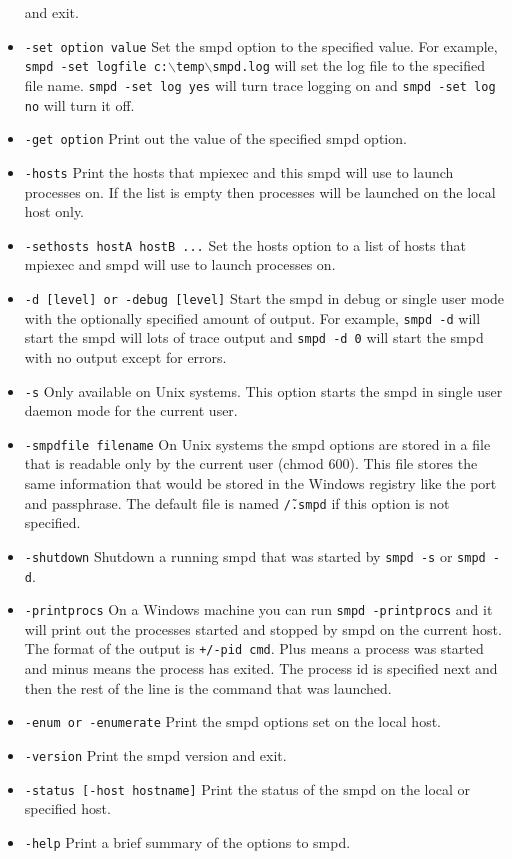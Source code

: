 \documentclass[dvipdfm,11pt]{article}
\begin{document}
\begin{itemize}
and exit.
\item \texttt{-set option value}
Set the smpd option to the specified value.  For example, \texttt{smpd -set logfile c:$\backslash$temp$\backslash$smpd.log} will set the log file to the 
specified file name.  \texttt{smpd -set log yes} will turn trace logging on and
\texttt{smpd -set log no} will turn it off.
\item \texttt{-get option}
Print out the value of the specified smpd option.
\item \texttt{-hosts}
Print the hosts that mpiexec and this smpd will use to launch processes on.  
If the list is empty then processes will be launched on the local host only.
\item \texttt{-sethosts hostA hostB ...}
Set the hosts option to a list of hosts that mpiexec and smpd will use to launch
processes on.
\item \texttt{-d [level] or -debug [level]}
Start the smpd in debug or single user mode with the optionally specified amount
of output.  For example, \texttt{smpd -d} will start the smpd will lots of trace
output and \texttt{smpd -d 0} will start the smpd with no output except for errors.
\item \texttt{-s}
Only available on Unix systems.  This option starts the smpd in single user daemon
mode for the current user.
\item \texttt{-smpdfile filename}
On Unix systems the smpd options are stored in a file that is readable only by
the current user (chmod 600).  This file stores the same information that would
be stored in the Windows registry like the port and passphrase.  The default
file is named \texttt{\~/.smpd} if this option is not specified.
\item \texttt{-shutdown}
Shutdown a running smpd that was started by \texttt{smpd -s} or \texttt{smpd -d}.
\item \texttt{-printprocs}
On a Windows machine you can run \texttt{smpd -printprocs} and it will print out
the processes started and stopped by smpd on the current host.  The format of the
output is \texttt{+/-pid cmd}.  Plus means a process was started and minus means
the process has exited.  The process id is specified next and then the rest of the line
is the command that was launched.
\item \texttt{-enum or -enumerate}
Print the smpd options set on the local host.
\item \texttt{-version}
Print the smpd version and exit.
\item \texttt{-status [-host hostname]}
Print the status of the smpd on the local or specified host.
\item \texttt{-help}
Print a brief summary of the options to smpd.
\end{itemize}
\end{document}
